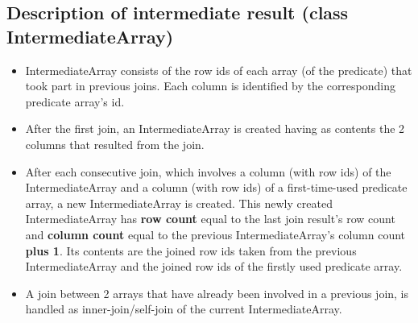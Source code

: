\documentclass{ws-ijprai}
\begin{document}
\subsection{Description of intermediate result (class IntermediateArray)}
\begin{itemize}
    \item IntermediateArray consists of the row ids of each array (of the predicate) that took part in previous joins. Each column is identified by the corresponding predicate array’s id.
    \item After the first join, an IntermediateArray is created having as contents the 2 columns that resulted from the join.
    \item After each consecutive join, which involves a column (with row ids) of the IntermediateArray and a column (with row ids) of a first-time-used predicate array, a new IntermediateArray is created. This newly created IntermediateArray has \textbf{row count} equal to the last join result’s row count and \textbf{column count} equal to the previous IntermediateArray’s column count \textbf{plus 1}. Its contents are the joined row ids taken from the previous IntermediateArray and the joined row ids of the firstly used predicate array.
    \item A join between 2 arrays that have already been involved in a previous join, is handled as inner-join/self-join of the current IntermediateArray.

\end{itemize}
\end{document}
